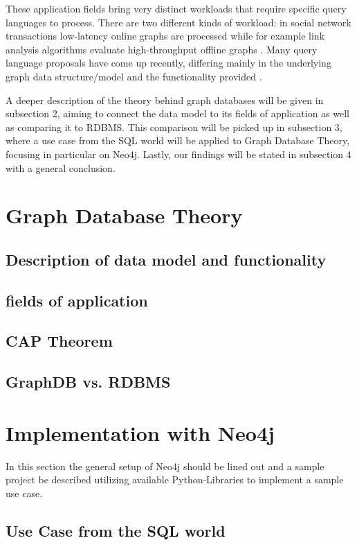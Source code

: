 These application fields bring very distinct workloads that require specific query languages to process. There are two different kinds of workload: in social network transactions low-latency online graphs are processed while for example link analysis algorithms evaluate high-throughput offline graphs \cite{Angles2018AnIT}. Many query language proposals have come up recently, differing mainly in the underlying graph data structure/model and the functionality provided \cite{Wood2012QueryLF}.

A deeper description of the theory behind graph databases will be given in subsection 2, aiming to connect the data model to its fields of application as well as comparing it to RDBMS. This comparison will be picked up in subsection 3, where a use case from the SQL world will be applied to Graph Database Theory, focusing in particular on Neo4j. Lastly, our findings will be stated in subsection 4 with a general conclusion.


\section{Graph Database Theory}
\subsection{Description of data model and functionality}
\subsection{fields of application}
\subsection{CAP Theorem}
\subsection{GraphDB vs. RDBMS}

\section{Implementation with Neo4j}
In this section the general setup of Neo4j should be lined out and a sample project be described utilizing available Python-Libraries to implement a sample use case.

\subsection{Use Case from the SQL world}

